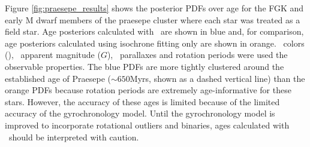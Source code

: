 Figure \ref{fig:praesepe_results} shows the posterior PDFs over age for the
FGK and early M dwarf members of the praesepe cluster where each star was
treated as a field star.
Age posteriors calculated with \sd\ are shown in blue and, for comparison, age
posteriors calculated using isochrone fitting only are shown in orange.
\gaia\ colors (\gcolor), \gaia\ apparent magnitude ($G$), \gaia\ parallaxes
and rotation periods were used the observable properties.
The blue PDFs are more tightly clustered around the established age of
Praesepe ($\sim650$Myrs, shown as a dashed vertical line) than the orange PDFs
because rotation periods are extremely age-informative for these stars.
However, the accuracy of these ages is limited because of the limited accuracy
of the gyrochronology model.
Until the gyrochronology model is improved to incorporate rotational outliers
and binaries, ages calculated with \sd\ should be interpreted with caution.

